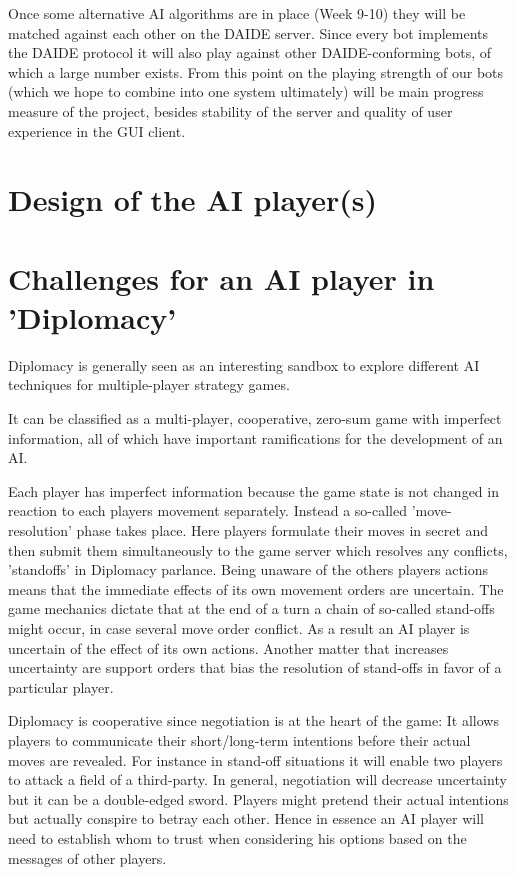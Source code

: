 \documentclass[12pt]{article}
\begin{document}
\begin{itemize}
Once some alternative AI algorithms are in place (Week 9-10) they will be matched against
each other on the DAIDE server. Since every bot implements the DAIDE protocol
it will also play against other DAIDE-conforming bots, of which
a large number exists. From this point on the playing strength of our
bots (which we hope to combine into one system ultimately) will be main 
progress measure of the project, besides stability of the server and quality
of user experience in the GUI client.

\section{Design of the AI player(s)}

\section{Challenges for an AI player in 'Diplomacy'}

Diplomacy is generally seen as an interesting sandbox to explore
different AI techniques for multiple-player strategy games.

It can be classified as a multi-player, cooperative, zero-sum game
with imperfect information, all of which have important ramifications
for the development of an AI.

Each player has imperfect information because the game state is not
changed in reaction to each players movement separately. Instead a 
so-called 'move-resolution' phase takes place. Here players formulate
their moves in secret and then submit them simultaneously to the game
server which resolves any conflicts, 'standoffs'
in Diplomacy parlance. Being unaware of the others players actions means
that the immediate effects of its own movement orders are uncertain. The
game mechanics dictate that at the end of a turn a chain of so-called 
stand-offs might occur, in case several move order conflict. As a result
an AI player is uncertain of the effect of its own actions. Another matter
that increases uncertainty are support orders that bias the resolution of
stand-offs in favor of a particular player. 

Diplomacy is cooperative since negotiation is at the heart of the game:
It allows players to communicate their short/long-term intentions before
their actual moves are revealed. For instance in stand-off situations it will
enable two players to attack a field of a third-party. In general, negotiation
will decrease uncertainty but it can be a double-edged sword. Players might
pretend their actual intentions but actually conspire to betray each other. Hence
in essence an AI player will need to establish whom to trust when considering
his options based on the messages of other players.


\end{itemize}
\end{document}
